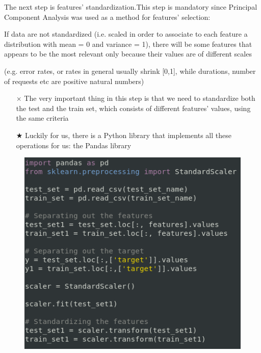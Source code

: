 	\begin{frame}
		The next step is features' standardization.\newline\newline This step is mandatory since Principal Component Analysis was used as a method for features' selection:
		\begin{center} If data are not standardized (i.e. scaled in order to associate to each feature a distribution with mean = 0 and variance = 1), there will be some features that appears to be the most relevant only because their values are of different scales\end{center}
		 (e.g. error rates, or rates in general usually shrink [0,1], while durations, number of requests etc are positive natural numbers)\newline\newline
		 \begin{itemize}
		 	\item[$\times$] The very important thing in this step is that we need to standardize both the test and the train set, which consists of different features' values, using the same criteria
		 	\item[$\bigstar$] Luckily for us, there is a Python library that implements all these operations for us: the Pandas library
		 \end{itemize}
	\end{frame}
	
	\begin{frame}
		\begin{figure}
			\includegraphics[width=\textwidth,height=0.8\textheight,keepaspectratio]{img/Normalization.png}
		\end{figure}
	\end{frame}
	
